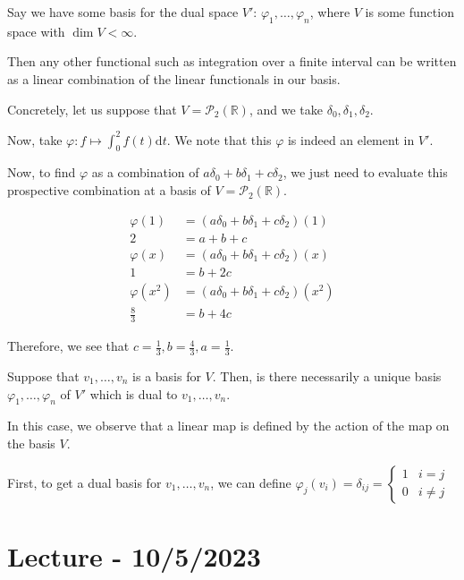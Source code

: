 \documentclass[openany]{book}
\newcommand{\RR}{\mathbb{R}}
\begin{document}
\begin{rmk}
	Say we have some basis for the dual space $V'$: $\varphi_1, \ldots, \varphi_n$, where $V$ is some function space with $\dim V < \infty$.
	
	Then any other functional such as integration over a finite interval can be written as a linear combination of the linear functionals in our basis.
	
	Concretely, let us suppose that $V = \mathscr{P}_{2}(\RR)$, and we take $\delta_0, \delta_1,\delta_2$.
	
	Now, take $\varphi : f \mapsto \int_0^{2} f(t) \mathrm dt$. We note that this $\varphi$ is indeed an element in $V'$.
	
	Now, to find $\varphi$ as a combination of $a\delta_0 + b\delta_1+c\delta_2$, we just need to evaluate this prospective combination at a basis of $V  = \mathscr{P}_{2}(\RR)$.
	
	\begin{align*}
		\varphi(1) &= (a\delta_0 + b\delta_1 + c\delta_2)(1) \\
		2 &= a + b + c \\
		\varphi(x) &= (a\delta_0+b\delta_1+c\delta_2)(x) \\
		1 &= b + 2c \\
		\varphi(x^{2}) &= (a\delta_0+b\delta_1+c\delta_{2})(x^{2}) \\
		\frac 8 3 &= b + 4c
	\end{align*}

	Therefore, we see that $c = \frac{1}{3}, b = \frac{4}{3}, a = \frac{1}{3}$.
\end{rmk}

\begin{rmk}
	Suppose that $v_{1}, \ldots, v_{n}$ is a basis for $V$. Then, is there necessarily a unique basis $\varphi_1, \ldots, \varphi_n$ of $V'$ which is dual to $v_{1}, \ldots, v_{n}$.
	
	In this case, we observe that a linear map is defined by the action of the map on the basis $V$.
	
	First, to get a dual basis for $v_{1}, \ldots, v_{n}$, we can define $\varphi_j(v_{i}) = \delta_{ij} = \begin{cases}
		1 & i = j \\ 0 & i \not= j
	\end{cases}$ 
\end{rmk}
	
\section{Lecture - 10/5/2023}
\end{document}
